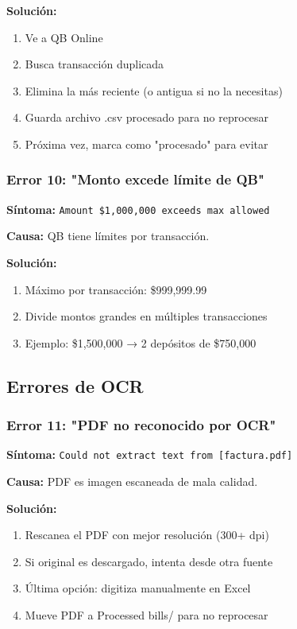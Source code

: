 \documentclass[12pt,oneside]{article}
\begin{document}
\textbf{Solución:}
\begin{enumerate}
    \item Ve a QB Online
    \item Busca transacción duplicada
    \item Elimina la más reciente (o antigua si no la necesitas)
    \item Guarda archivo .csv procesado para no reprocesar
    \item Próxima vez, marca como "procesado" para evitar
\end{enumerate}

\subsubsection{Error 10: "Monto excede límite de QB"}

\textbf{Síntoma:} \texttt{Amount \$1,000,000 exceeds max allowed}

\textbf{Causa:} QB tiene límites por transacción.

\textbf{Solución:}
\begin{enumerate}
    \item Máximo por transacción: \$999,999.99
    \item Divide montos grandes en múltiples transacciones
    \item Ejemplo: \$1,500,000 → 2 depósitos de \$750,000
\end{enumerate}

\subsection{Errores de OCR}

\subsubsection{Error 11: "PDF no reconocido por OCR"}

\textbf{Síntoma:} \texttt{Could not extract text from [factura.pdf]}

\textbf{Causa:} PDF es imagen escaneada de mala calidad.

\textbf{Solución:}
\begin{enumerate}
    \item Rescanea el PDF con mejor resolución (300+ dpi)
    \item Si original es descargado, intenta desde otra fuente
    \item Última opción: digitiza manualmente en Excel
    \item Mueve PDF a Processed bills/ para no reprocesar
\end{enumerate}
\end{document}

